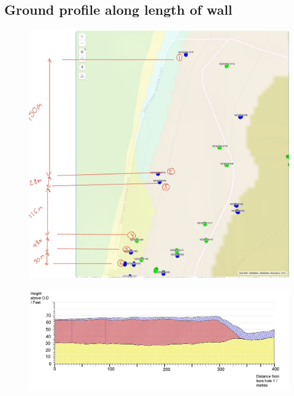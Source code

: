\documentclass[12pt, a4paper]{article}
\begin{document}
\begin{appendices}
\section{Ground profile along length of wall}
\begin{figure}[H]
  \centering
  	\includegraphics[width=0.5\textheight]{key}
   	\caption{}
	\label{length}
\end{figure}

\begin{figure}[H]
  \hspace*{-1.65cm}
  	\includegraphics[width=0.8\textheight]{groundprof}
   	\caption{}
	\label{length}
\end{figure}


\end{appendices}
\end{document}

